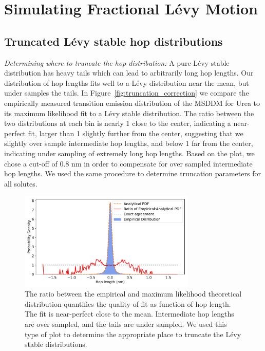 \documentclass{article}
\begin{document}
  \section{Simulating Fractional L\'evy Motion}\label{section:sFLM}

  \subsection{Truncated L\'evy stable hop distributions}\label{section:truncation}
  
  \textit{Determining where to truncate the hop distribution:} A pure
  L\'evy stable distribution has heavy tails which can lead to arbitrarily
  long hop lengths. Our distribution of hop lengths fits well to a L\'evy
  distribution near the mean, but under samples the tails. In 
  Figure~\ref{fig:truncation_correction} we compare the empirically 
  measured transition emission distribution of the MSDDM for Urea to its maximum likelihood fit to
  a L\'evy stable distribution. The ratio between the two distributions 
  at each bin is nearly 1 close to the center, indicating a near-perfect
  fit, larger than 1 slightly further from the center, suggesting that 
  we slightly over sample intermediate hop lengths, and below 1 far from 
  the center, indicating under sampling of extremely long hop lengths.
  Based on the plot, we chose a cut-off of 0.8 nm in order to compensate for
  over sampled intermediate hop lengths. We used the same procedure
  to determine truncation parameters for all solutes.
  
  \begin{figure}
  \centering
  \includegraphics[width=0.75\textwidth]{truncation_cutoff.pdf}
  \caption{The ratio between the empirical and maximum likelihood theoretical
  distribution quantifies the quality of fit as function of hop length. The fit
  is near-perfect close to the mean. Intermediate hop lengths are over sampled, 
  and the tails are under sampled. We used this type of plot to determine the
  appropriate place to truncate the L\'evy stable distributions.}\label{fig:truncation_cutoff}
  \end{figure}
  
\end{document}
